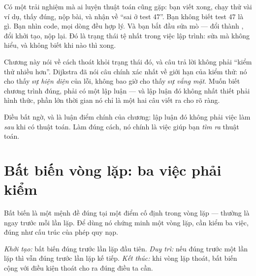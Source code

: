 \documentclass[../../algorithm.tex]{subfiles}
\begin{document}
Có một trải nghiệm mà ai luyện thuật toán cũng gặp: bạn viết xong, chạy thử vài ví dụ, thấy đúng, nộp bài, và nhận về ``sai ở test 47''. Bạn không biết test 47 là gì. Bạn nhìn code, mọi dòng đều hợp lý. Và bạn bắt đầu sửa mò --- đổi \code{<} thành \code{<=}, đổi khởi tạo, nộp lại. Đó là trạng thái tệ nhất trong việc lập trình: sửa mà không hiểu, và không biết khi nào thì xong.

Chương này nói về cách thoát khỏi trạng thái đó, và câu trả lời không phải ``kiểm thử nhiều hơn''. Dijkstra đã nói câu chính xác nhất về giới hạn của kiểm thử: nó cho thấy sự \emph{hiện diện} của lỗi, không bao giờ cho thấy sự \emph{vắng mặt}\cite{dijkstra1976}. Muốn biết chương trình đúng, phải có một lập luận --- và lập luận đó không nhất thiết phải hình thức, phần lớn thời gian nó chỉ là một hai câu viết ra cho rõ ràng.

Điều bất ngờ, và là luận điểm chính của chương: lập luận đó không phải việc làm \emph{sau} khi có thuật toán. Làm đúng cách, nó chính là việc giúp bạn \emph{tìm ra} thuật toán.

\section{Bất biến vòng lặp: ba việc phải kiểm}

Bất biến là một mệnh đề đúng tại một điểm cố định trong vòng lặp --- thường là ngay trước mỗi lần lặp. Để dùng nó chứng minh một vòng lặp, cần kiểm ba việc, đúng như cấu trúc của phép quy nạp.

\emph{Khởi tạo:} bất biến đúng trước lần lặp đầu tiên. \emph{Duy trì:} nếu đúng trước một lần lặp thì vẫn đúng trước lần lặp kế tiếp. \emph{Kết thúc:} khi vòng lặp thoát, bất biến cộng với điều kiện thoát cho ra đúng điều ta cần.
\end{document}

